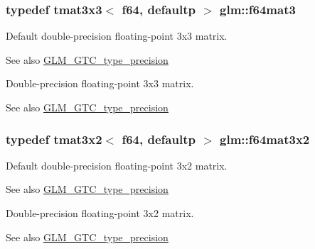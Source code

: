 \subsubsection[{f64mat3}]{\setlength{\rightskip}{0pt plus 5cm}typedef tmat3x3$<$ f64, defaultp $>$ {\bf glm\+::f64mat3}}\label{group__gtc__type__precision_ga44f23eb3c2e893d0afb1aa2b9e89be76}
Default double-\/precision floating-\/point 3x3 matrix. \begin{DoxySeeAlso}{See also}
\hyperlink{group__gtc__type__precision}{G\+L\+M\+\_\+\+G\+T\+C\+\_\+type\+\_\+precision}
\end{DoxySeeAlso}
Double-\/precision floating-\/point 3x3 matrix. \begin{DoxySeeAlso}{See also}
\hyperlink{group__gtc__type__precision}{G\+L\+M\+\_\+\+G\+T\+C\+\_\+type\+\_\+precision} 
\end{DoxySeeAlso}
\hypertarget{group__gtc__type__precision_ga0039ae03558b5242466f4c344c3c7d65}{}
\subsubsection[{f64mat3x2}]{\setlength{\rightskip}{0pt plus 5cm}typedef tmat3x2$<$ f64, defaultp $>$ {\bf glm\+::f64mat3x2}}\label{group__gtc__type__precision_ga0039ae03558b5242466f4c344c3c7d65}
Default double-\/precision floating-\/point 3x2 matrix. \begin{DoxySeeAlso}{See also}
\hyperlink{group__gtc__type__precision}{G\+L\+M\+\_\+\+G\+T\+C\+\_\+type\+\_\+precision}
\end{DoxySeeAlso}
Double-\/precision floating-\/point 3x2 matrix. \begin{DoxySeeAlso}{See also}
\hyperlink{group__gtc__type__precision}{G\+L\+M\+\_\+\+G\+T\+C\+\_\+type\+\_\+precision} 
\end{DoxySeeAlso}
\hypertarget{group__gtc__type__precision_gab272e67eb87cc1e8233237480c2aa8d2}{}
